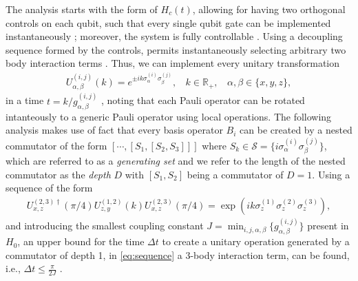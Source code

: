 \documentclass[aps,twocolumn,amsmath,amssymb,nofootinbib,superscriptaddress]{revtex4-1}
\begin{document}
The analysis starts with the form of $H_{c}(t)$, allowing for having two orthogonal controls on each qubit, such that every single qubit gate can be implemented instantaneously \cite{ExactCalc1, ExactCalc2}; moreover, the system is fully controllable \cite{Symmetries1}. Using a decoupling sequence \cite{LVioal1, Dec2} formed by the controls, permits instantaneously selecting arbitrary two body interaction terms \cite{DecLloyd}. Thus, we can implement every unitary transformation 
\begin{align}
\label{eq:twobodyunitary}
U_{\alpha,\beta}^{(i,j)}(k)=e^{\pm ik \sigma_{\alpha}^{(i)}\sigma_{\beta}^{(j)}},~~~~k\in \mathbb R_{+},~~~~\alpha,\beta\in\{x,y,z\},	
\end{align}
 in a time $t=k/g_{\alpha,\beta}^{(i,j)}$ \cite{OnlineMaterial}, noting that each Pauli operator can be rotated intanteously to a generic Pauli operator using local operations. The following analysis makes use of fact that every basis operator $B_{i}$ can be created by a nested commutator of the form $[\cdots,[S_{1},[S_{2},S_{3}]]]$ where $S_{k}\in\mathcal S=\{i\sigma_{\alpha}^{(i)}\sigma_{\beta}^{(j)}\}$, which are referred to as a \emph{generating set} and we refer to the length of the nested commutator as the \emph{depth} $D$ with $[S_{1},S_{2}]$ being a commutator of $D=1$.   Using a sequence of the form 
  \begin{align}
 \label{eq:sequence}
 U_{x,z}^{(2,3)\dagger}(\pi/4)U_{z,y}^{(1,2)}(k)U_{x,z}^{(2,3)}(\pi/4)=\exp(ik\sigma_{z}^{(1)}\sigma_{z}^{(2)}\sigma_{z}^{(3)}),
 \end{align}
 and introducing the smallest coupling constant $J=\min_{i,j,\alpha,\beta}\{g_{\alpha,\beta}^{(i,j)}\}$ present in $H_{0}$, an upper bound for the time $\Delta t$ to create a unitary operation generated by a commutator of depth 1, in \eqref{eq:sequence} a 3-body interaction term, can be found, i.e., $\Delta t\leq \frac{\pi}{2J}$ \cite{OnlineMaterial}.
 
\end{document}
